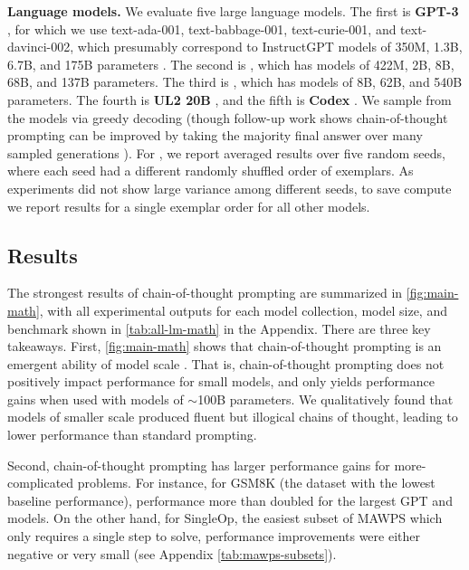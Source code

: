 \textbf{Language models.}
We evaluate five large language models.
The first is \textbf{GPT-3} \citep{brown2020language}, for which we use text-ada-001, text-babbage-001, text-curie-001, and text-davinci-002, which presumably correspond to InstructGPT models of 350M, 1.3B, 6.7B, and 175B parameters \citep{ouyang2022training}.
The second is \textbf{\lamda{}} \citep{thoppilan2022lamda}, which has models of 422M, 2B, 8B, 68B, and 137B parameters. 
The third is \textbf{\palm{}}, which has models of 8B, 62B, and 540B parameters.
The fourth is \textbf{UL2 20B} \citep{tay2022unifying}, and the fifth is \textbf{Codex} \citep[][code-davinci-002 in the OpenAI API]{chen2021evaluating}.
We sample from the models via greedy decoding (though follow-up work shows chain-of-thought prompting can be improved by taking the majority final answer over many sampled generations \citep{wang2022self}).
For \lamda{}, we report averaged results over five random seeds, where each seed had a different randomly shuffled order of exemplars.
As \lamda{} experiments did not show large variance among different seeds, to save compute we report results for a single exemplar order for all other models.

\subsection{Results}
The strongest results of chain-of-thought prompting are summarized in \cref{fig:main-math}, with all experimental outputs for each model collection, model size, and benchmark shown in \cref{tab:all-lm-math} in the Appendix.
There are three key takeaways.
First, \cref{fig:main-math} shows that chain-of-thought prompting is an emergent ability of model scale \citep{wei2022emergent}. 
That is, chain-of-thought prompting does not positively impact performance for small models, and only yields performance gains when used with models of $\sim$100B parameters.
We qualitatively found that models of smaller scale produced fluent but illogical chains of thought, leading to lower performance than standard prompting.


Second, chain-of-thought prompting has larger performance gains for more-complicated problems. 
For instance, for GSM8K (the dataset with the lowest baseline performance), performance more than doubled for the largest GPT and \palm{} models. 
On the other hand, for SingleOp, the easiest subset of MAWPS which only requires a single step to solve, performance improvements were either negative or very small (see Appendix \cref{tab:mawps-subsets}).

